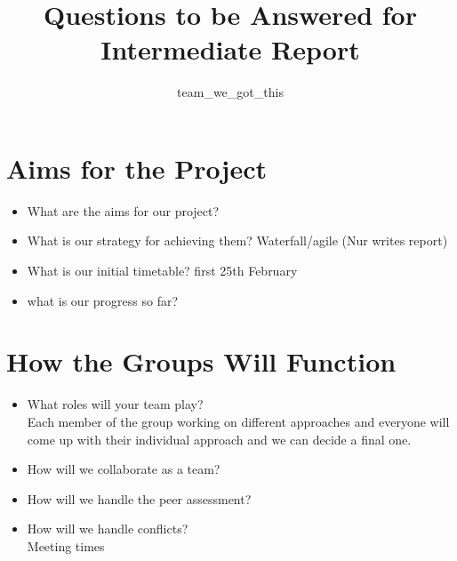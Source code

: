\documentclass[]{article}
\begin{document}
\title{Questions to be Answered for Intermediate Report}
\author{team\_we\_got\_this}

\maketitle


\section*{Aims for the Project}
\begin{itemize}
	\item What are the aims for our project?
	\item What is our strategy for achieving them?
	Waterfall/agile (Nur writes report)
	\item What is our initial timetable?
	first 25th February
	\item what is our progress so far?\\

\end{itemize}

\section*{How the Groups Will Function}

\begin{itemize}
\item What roles will your team play?\\
	Each member of the group working on different approaches and everyone will come up with their individual approach and we can decide a final one. 
	
	
\item How will we collaborate as a team?
\item How will we handle the peer assessment?
\item How will we handle conflicts?  \\
Meeting times
\end{itemize}
\end{document}
